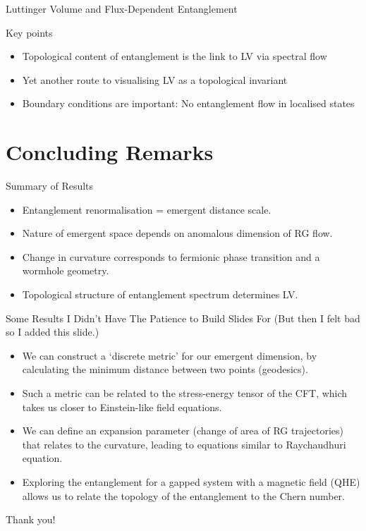 \documentclass[12pt,aspectratio=169]{beamer}
\begin{document}
\begin{frame}{Luttinger Volume and Flux-Dependent Entanglement}
{	\flushleft
	\alert{Key points}
	\begin{itemize}
		\item Topological content of entanglement is the link to LV via spectral flow
		\item Yet another route to visualising LV as a topological invariant
		\item \alert{Boundary conditions} are important: No entanglement flow in localised states
	\end{itemize}
}
\end{frame}

\section{Concluding Remarks}
\begin{frame}{Summary of Results}
	\begin{itemize}
		\item Entanglement renormalisation = emergent distance scale. \\[10pt]
		\item Nature of emergent space depends on anomalous dimension of RG flow.\\[10pt]
		\item Change in curvature corresponds to fermionic phase transition and a wormhole geometry.\\[10pt]
		\item Topological structure of entanglement spectrum determines LV.\\[10pt]
	\end{itemize}
\end{frame}

\begin{frame}{Some Results I Didn't Have The Patience to Build Slides For}
	(\alert{But then I felt bad so I added this slide.})
	\vspace*{\fill}

	\begin{itemize}[<+->]
		\item We can construct a `discrete metric' for our emergent dimension, by calculating the minimum distance between two points (geodesics).\\[10pt]
		\item Such a metric can be related to the stress-energy tensor of the CFT, which takes us closer to Einstein-like field equations.\\[10pt]
		\item We can define an expansion parameter (change of area of RG trajectories) that relates to the curvature, leading to equations similar to Raychaudhuri equation.\\[10pt]
		\item Exploring the entanglement for a gapped system with a magnetic field (QHE) allows us to relate the topology of the entanglement to the Chern number.
	\end{itemize}

\end{frame}

\begin{frame}{}
	\LARGE Thank you!
\end{frame}
\printbibliography
\end{document}
